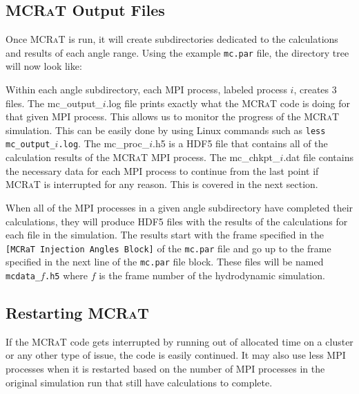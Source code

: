 \documentclass[12pt,a4paper]{article}
\newcommand{\mcrat}{\textsc{MCRaT}}
\begin{document}
 \subsection{\mcrat{} Output Files}
 Once \mcrat{} is run, it will create subdirectories dedicated to the calculations and results of each angle range. Using the example \texttt{mc.par} file, the directory tree will now look like: 
 
 \begin{figure}[h!]
 \end{figure}
 
 Within each angle subdirectory, each MPI process, labeled process $i$, creates 3 files. The mc\_output\_$i$.log file prints exactly what the \mcrat{} code is doing for that given MPI process. This allows us to monitor the progress of the \mcrat{} simulation. This can be easily done by using Linux commands such as \texttt{less mc\_output\_$i$.log}. The mc\_proc\_$i$.h5 is a HDF5 file that contains all of the calculation results of the \mcrat{} MPI process. The mc\_chkpt\_$i$.dat file contains the necessary data for each MPI process to continue from the last point if \mcrat{} is interrupted for any reason. This is covered in the next section.
 
 When all of the MPI processes in a given angle subdirectory have completed their calculations, they will produce HDF5 files with the results of the calculations for each file in the simulation. The results start with the frame specified in the \texttt{[MCRaT Injection Angles Block]} of the \texttt{mc.par} file and go up to the frame specified in the next line of the \texttt{mc.par} file block. These files will be named \texttt{mcdata\_$f$.h5} where $f$ is the frame number of the hydrodynamic simulation.
 
 \subsection{Restarting \mcrat{}}
 If the \mcrat{} code gets interrupted by running out of allocated time on a cluster or any other type of issue, the code is easily continued. It may also use less MPI processes when it is restarted based on the number of MPI processes in the original simulation run that still have calculations to complete. 
 
\end{document}
